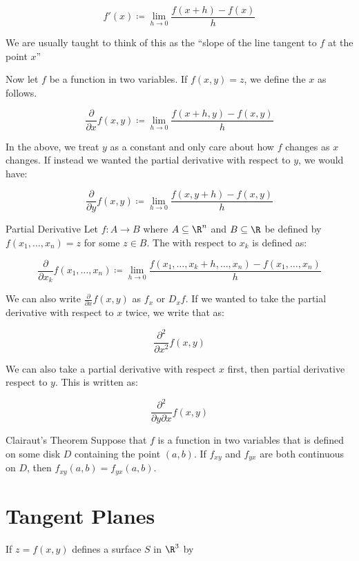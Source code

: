\documentclass[math]{amznotes}
\begin{document}
\[ f\prime(x) \coloneq \lim_{h \to 0} \frac{f(x+h) - f(x)}{h} \]

We are usually taught to think of this as the ``slope of the line tangent to $f$ at the point $x$''

Now let $f$ be a function in two variables. If $f(x,y) = z$, we define the  $x$ as follows.

\[ \frac{\partial}{\partial x} f(x,y) \coloneq \lim_{h \to 0} \frac{f(x+h, y) - f(x,y)}{h} \]

In the above, we treat $y$ as a constant and only care about how $f$ changes as $x$ changes. If instead we wanted the partial derivative with respect to $y$, we would have:

\[ \frac{\partial}{\partial y} f(x,y) \coloneq \lim_{h \to 0} \frac{f(x, y+h) - f(x,y)}{h} \]

\begin{dfnbox}{Partial Derivative}{}
    Let $f : A \to B$ where $A \subseteq \R^n$ and $B \subseteq \R$ be defined by $f(x_1, \ldots, x_n) = z$ for some $z \in B$. The  with respect to $x_k$ is defined as:

    \[ \frac{\partial}{\partial x_k} f(x_1, \ldots, x_n) \coloneq \lim_{h \to 0} \frac{f(x_1, \ldots, x_k + h, \ldots, x_n) - f(x_1, \ldots, x_n)}{h} \]
\end{dfnbox}



We can also write $\frac{\partial}{\partial x} f(x,y)$ as $f_x$ or $D_x f$. If we wanted to take the partial derivative with respect to $x$ twice, we write that as:

\[ \frac{\partial^2}{\partial x^2} f(x,y) \]

We can also take a partial derivative with respect $x$ first, then partial derivative respect to $y$. This is written as:

\[ \frac{\partial^2}{\partial y \partial x} f(x,y) \]

\begin{thmbox}{Clairaut's Theorem}{}
    Suppose that $f$ is a function in two variables that is defined on some disk $D$ containing the point $(a,b)$. If $f_{xy}$ and $f_{yx}$ are both continuous on $D$, then $f_{xy}(a,b) = f_{yx}(a,b)$.
\end{thmbox}

\section{Tangent Planes}

If $z = f(x,y)$ defines a surface $S$ in $\R^3$ by 

\amzindex
\end{document}
